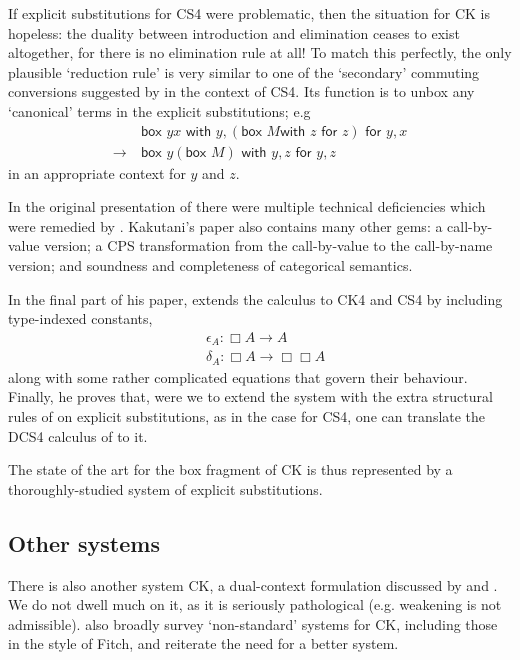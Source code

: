 \documentclass[a4paper]{amsart}
\begin{document}
If explicit substitutions for \textsf{CS4} were problematic, then
the situation for \textsf{CK} is hopeless: the duality between
introduction and elimination ceases to exist altogether, for there
is no elimination rule at all! To match this perfectly, the only
plausible `reduction rule' is very similar to one of the
`secondary' commuting conversions suggested by
\cite{Goubault-Larrecq1996} in the context of \textsf{CS4}. Its
function is to unbox any `canonical' terms in the explicit
substitutions; e.g \begin{align*}
  &\textsf{box } yx \textsf{ with } y, (\textsf{box } M \textsf{
  with } z \textsf{ for } z) \textsf{ for } y, x \\
    \longrightarrow\
  &\textsf{box } y(\textsf{box } M) \textsf{ with } y, z
  \textsf{ for } y, z
\end{align*} in an appropriate context for $y$ and $z$.

In the original presentation of \cite{Bellin2001} there were
multiple technical deficiencies which were remedied by
\cite{Kakutani2007a}. Kakutani's paper also contains many other
gems: a call-by-value version; a CPS transformation from the
call-by-value to the call-by-name version; and soundness and
completeness of categorical semantics. 

In the final part of his paper, \cite{Kakutani2007a} extends the
calculus to \textsf{CK4} and \textsf{CS4} by including
type-indexed constants, \begin{align*}
  &\epsilon_A : \Box A \rightarrow A \\
  &\delta_A : \Box A \rightarrow \Box \Box A
\end{align*} along with some rather complicated equations that
govern their behaviour. Finally, he proves that, were we to
extend the system with the extra structural rules of
\cite{Goubault-Larrecq1996} on explicit substitutions, as in the
case for \textsf{CS4}, one can translate the \textsf{DCS4}
calculus of \cite{Davies2001} to it.

The state of the art for the box fragment of \textsf{CK} is thus
represented by a thoroughly-studied system of explicit
substitutions.

\subsection{Other systems}

There is also another system \textsf{CK}, a dual-context
formulation discussed by \cite{Bellin2001} and \cite{dePaiva2011}.
We do not dwell much on it, as it is seriously pathological (e.g.
weakening is not admissible). \cite{dePaiva2011} also broadly
survey `non-standard' systems for \textsf{CK}, including those in
the style of Fitch, and reiterate the need for a better system.
\end{document}
